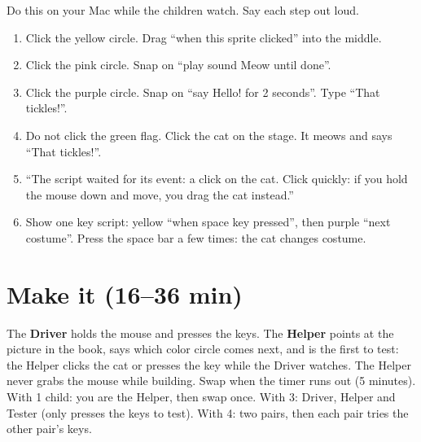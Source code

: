 \begin{workedexample}
Do this on your Mac while the children watch. Say each step out loud.
\begin{enumerate}[leftmargin=1.4em,itemsep=1pt]
  \item Click the yellow  circle. Drag \enquote{when this sprite clicked} into the middle.
  \item Click the pink  circle. Snap on \enquote{play sound Meow until done}.
  \item Click the purple  circle. Snap on \enquote{say Hello! for 2 seconds}. Type \enquote{That tickles!}.
  \item Do not click the green flag. Click the cat on the stage. It meows and says \enquote{That tickles!}.
  \item \enquote{The script waited for its event: a click on the cat. Click quickly: if you hold the mouse down and move, you drag the cat instead.}
  \item Show one key script: yellow  \enquote{when space key pressed}, then purple  \enquote{next costume}. Press the space bar a few times: the cat changes costume.
\end{enumerate}
\begin{center}
\begin{scratch}[scale=0.85]
\end{scratch}
\end{center}
\end{workedexample}

\section{Make it (16--36 min)}
\begin{pairroles}
The \textbf{Driver} holds the mouse and presses the keys. The \textbf{Helper} points at the picture in the book, says which color circle comes next, and is the first to test: the Helper clicks the cat or presses the key while the Driver watches. The Helper never grabs the mouse while building. Swap when the timer runs out (5 minutes). With 1 child: you are the Helper, then swap once. With 3: Driver, Helper and Tester (only presses the keys to test). With 4: two pairs, then each pair tries the other pair's keys.
\end{pairroles}

